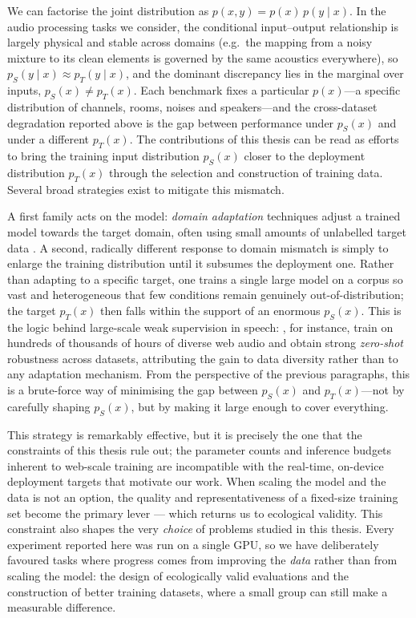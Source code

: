 We can factorise the joint
distribution as $p(x, y) = p(x)\,p(y \mid x)$. In the audio processing tasks we
consider, the conditional input--output relationship is largely physical and
stable across domains (e.g.\ the mapping from a noisy mixture to its clean
elements is governed by the same acoustics everywhere), so $p_S(y \mid x) \approx
p_T(y \mid x)$, and the dominant discrepancy lies in the marginal over inputs,
$p_S(x) \neq p_T(x)$. Each benchmark fixes a particular $p(x)$---a specific
distribution of channels, rooms, noises and speakers---and the cross-dataset
degradation reported above is the gap between performance under $p_S(x)$ and under
a different $p_T(x)$. The contributions of this thesis can be read
as efforts to bring the training input distribution $p_S(x)$ closer to the
deployment distribution $p_T(x)$ through the selection and construction of
training data. Several broad strategies exist to mitigate this mismatch. 

A first family acts on the
model: \emph{domain adaptation} techniques adjust a trained model towards the target domain, often using small amounts
of unlabelled target data \citep{hsu2017unsupervised}. A second, radically different response to domain mismatch is simply to enlarge the
training distribution until it subsumes the deployment one. Rather than adapting
to a specific target, one trains a single large model on a corpus so vast and
heterogeneous that few conditions remain genuinely out-of-distribution; the
target $p_T(x)$ then falls within the support of an enormous $p_S(x)$. This is the
logic behind large-scale weak supervision in speech: \citet{radford2022whisper},
for instance, train on hundreds of thousands of hours of diverse web audio and
obtain strong \emph{zero-shot} robustness across datasets, attributing the gain to
data diversity rather than to any adaptation mechanism. From the perspective of
the previous paragraphs, this is a brute-force way of minimising the gap between
$p_S(x)$ and $p_T(x)$---not by carefully shaping $p_S(x)$, but by making it large
enough to cover everything.

This strategy is remarkably effective, but it is precisely the one that the
constraints of this thesis rule out; the parameter counts and inference budgets
inherent to web-scale training are incompatible with the real-time, on-device
deployment targets that motivate our work. When scaling the model and the data
is not an option, the quality and representativeness of a fixed-size training
set become the primary lever --- which returns us to ecological validity. This
constraint also shapes the very \emph{choice} of problems studied in this
thesis. Every experiment reported here was run on a single \acrfull{GPU}, so we
have deliberately favoured tasks where progress comes from improving the
\emph{data} rather than from scaling the model: the design of ecologically valid
evaluations and the construction of better training datasets, where a small
group can still make a measurable difference.

